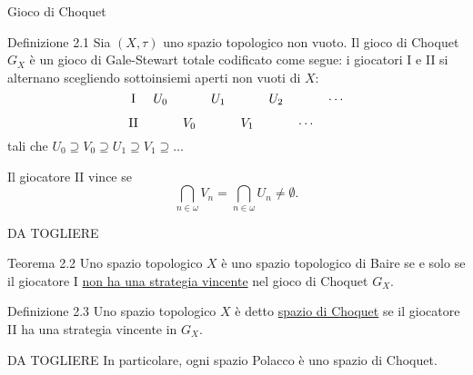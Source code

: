\documentclass[babel]{beamer}
\renewcommand{\href}[2]{#2}
\begin{document}
\begin{frame}[label={sec:org6ff8b90}]{Gioco di Choquet}
\begin{block}{Definizione 2.1}
Sia \((X,\tau)\) uno \href{../../../../../../../org/roam/20250103145124-topologia.org}{spazio topologico} non vuoto. Il gioco di Choquet \(G_{X}\) è un \href{../../../../../../../org/roam/20250513155732-logic_game.org}{gioco} \href{../../../../../../../org/roam/20250513171520-giochi_di_gale_stewart.org}{di Gale-Stewart} totale codificato come segue: i giocatori I e II si alternano scegliendo sottoinsiemi aperti non vuoti di \(X\):
\begin{equation*}
\begin{tikzcd}[ampersand replacement=\&,cramped,sep=tiny]
	{\text{I}} \& {U_0} \&\& {U_1} \&\& {U_2} \&\& \cdots \\
	{\text{II}} \&\& {V_0} \&\& {V_1} \&\& \cdots
\end{tikzcd}
\end{equation*}
tali che \(U_{0} \supseteq V_{0}\supseteq U_{1}\supseteq V_{1}\supseteq \dots\)

Il giocatore II vince se
\begin{equation*}
\bigcap_{n \in \omega} V_{n} = \bigcap_{n \in \omega} U_{n} \neq \emptyset.
\end{equation*}
\end{block}
\end{frame}
\begin{frame}[label={sec:org8663b73}]{DA TOGLIERE}
\begin{alertblock}{Teorema 2.2}
Uno \href{../../../../../../../org/roam/20250103145124-topologia.org}{spazio topologico} \(X\) è uno \href{../../../../../../../org/roam/20250514154101-spazio_topologico_di_baire.org}{spazio topologico di Baire} se e solo se il giocatore I \uline{non ha una \href{../../../../../../../org/roam/20250513171520-giochi_di_gale_stewart.org}{strategia} \href{../../../../../../../org/roam/20250513171520-giochi_di_gale_stewart.org}{vincente}} nel \href{../../../../../../../org/roam/20250514174255-gioco_di_choquet.org}{gioco di Choquet} \(G_{X}\).
\end{alertblock}
\begin{block}{Definizione 2.3}
Uno spazio topologico \(X\) è detto \uline{spazio di Choquet} se il giocatore II ha una strategia vincente in \(G_{X}\).
\end{block}
\begin{block}{DA TOGLIERE}
In particolare, ogni spazio Polacco è uno spazio di Choquet.
\end{block}
\end{frame}
\end{document}
